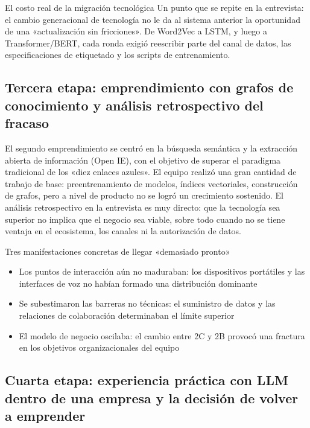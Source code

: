 \begin{knowledgebox}{El costo real de la migración tecnológica}
Un punto que se repite en la entrevista: el cambio generacional de tecnología no le da al sistema anterior la oportunidad de una «actualización sin fricciones». De Word2Vec a LSTM, y luego a Transformer/BERT, cada ronda exigió reescribir parte del canal de datos, las especificaciones de etiquetado y los scripts de entrenamiento.
\end{knowledgebox}

\subsection{Tercera etapa: emprendimiento con grafos de conocimiento y análisis retrospectivo del fracaso}

El segundo emprendimiento se centró en la búsqueda semántica y la extracción abierta de información (Open IE), con el objetivo de superar el paradigma tradicional de los «diez enlaces azules». El equipo realizó una gran cantidad de trabajo de base: preentrenamiento de modelos, índices vectoriales, construcción de grafos, pero a nivel de producto no se logró un crecimiento sostenido. El análisis retrospectivo en la entrevista es muy directo: que la tecnología sea superior no implica que el negocio sea viable, sobre todo cuando no se tiene ventaja en el ecosistema, los canales ni la autorización de datos.

\begin{warningbox}{Tres manifestaciones concretas de llegar «demasiado pronto»}
\begin{itemize}
    \item Los puntos de interacción aún no maduraban: los dispositivos portátiles y las interfaces de voz no habían formado una distribución dominante
    \item Se subestimaron las barreras no técnicas: el suministro de datos y las relaciones de colaboración determinaban el límite superior
    \item El modelo de negocio oscilaba: el cambio entre 2C y 2B provocó una fractura en los objetivos organizacionales del equipo
\end{itemize}
\end{warningbox}

\subsection{Cuarta etapa: experiencia práctica con LLM dentro de una empresa y la decisión de volver a emprender}

